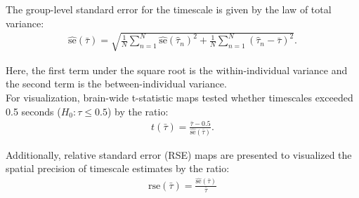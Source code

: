 \documentclass[latex/main.tex]{subfiles}
\begin{document}
\noindent The group-level standard error for the timescale is given by the law of total variance:
\begin{align}
    \widehat{\text{se}}(\bar\tau) = \sqrt{\frac{1}{N} \sum_{n=1}^N \widehat{\text{se}}(\hat\tau_n)^2 + \frac{1}{N} \sum_{n=1}^N (\hat\tau_n - \bar\tau)^2}.
\end{align}

\noindent Here, the first term under the square root is the within-individual variance and the second term is the between-individual variance.\\

For visualization, brain-wide t-statistic maps tested whether timescales exceeded 0.5 seconds ($H_0: \tau \leq 0.5$) by the ratio:
\begin{align}\label{eq:t-ratio}
    t(\bar\tau) = \frac{\bar\tau-0.5}{\widehat{\text{se}}(\bar\tau)}.
\end{align}

\noindent Additionally, relative standard error (RSE) maps are presented to visualized the spatial precision of timescale estimates by the ratio:
\begin{align}
    \text{rse}(\bar\tau) = \frac{\widehat{\text{se}}(\bar\tau)}{\bar\tau}
\end{align}
\end{document}
